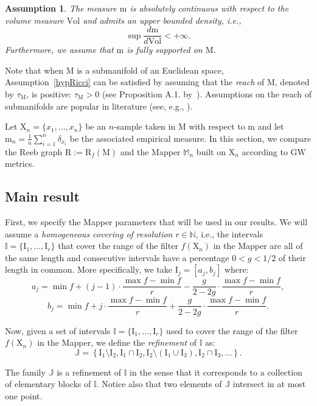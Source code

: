 \documentclass[pdflatex,sn-mathphys-ay]{sn-jnl}%
\newcommand{\reeb}{\mathrm{R}}
\newcommand{\man}{\mathrm{M}}
\newcommand{\sample}{\mathrm{X}}
\newcommand{\mes}{\mathrm{m}}
\newcommand{\gromov}{\mathrm{GW}}
\newcommand{\Reeb}{{\mathrm R}}
\newcommand{\interv}{{\mathrm {I}}}
\newcommand{\mapper}{{\mathbb{M}_n}}
\newcommand{\dirac}{\delta}
\newcommand{\diracn}{\mathrm{m}_n}
\newcommand{\vol}{\mathrm{Vol}}
\newcommand{\N}{\mathbb{N}}
\newtheorem{hypothesis}{Assumption}
\theoremstyle{thmstyleone}%
\begin{document}
\begin{hypothesis}\label{hypdensity}
	The measure $\mes$ is absolutely continuous with respect to the volume measure $\vol$ and admits an upper bounded density, i.e., $$\sup\frac{d\mes}{d\vol}<+\infty.$$ Furthermore, we assume that $\mes$ is fully supported on $\man$.  
\end{hypothesis}

Note that when $\man$ is a submanifold of an Euclidean space, Assumption~\ref{hypRicci} can be satisfied by assuming that the {\em reach} of $\man$, denoted by $\tau_{\man}$, is positive: $\tau_{\man}>0$ (see Proposition A.1. by~\citet{aamari2019estimating}). Assumptions on the reach of submanifolds are popular in literature (see, e.g., \citet{niyogi2008finding,burgisser2018computing}). 

Let $\sample_n=\{x_1,...,x_n\}$ be an $n$-sample taken in $\man$ with respect to $\mes$ and let $\diracn=\frac{1}{n}\sum_{i=1}^n \dirac_{x_i}$ be the associated empirical measure. In this section, we compare the Reeb graph $\Reeb:=\reeb_f(\man)$ and the Mapper $\mapper$ built on $\sample_n$ according to $\gromov$ metrics.


\subsection{Main result}

First, we specify the Mapper parameters that will be used in our results.
We will assume a {\em homogeneous covering of resolution} $r\in\N$, i.e., the intervals $\mathbb{I}=\{\interv_1,...,\interv_r\}$ that cover the range of the filter $f(\sample_n)$ in the Mapper are all of the same length and consecutive intervals have a percentage $0<g<1/2$ of their length in common. More specifically, we take $\interv_j=[a_j,b_j]$ where:
$$a_j=\min f+(j-1)\cdot\frac{\max f-\min f}{r}-\frac{g}{2-2 g}\cdot\frac{\max f - \min f}{r},$$
$$b_j=\min f+j\cdot\frac{\max f-\min f}{r}+\frac{g}{2-2 g}\cdot\frac{\max f - \min f}{r}.$$

Now, given a set of intervals $\mathbb{I}=\{\interv_1,...,\interv_r\}$ used to cover the range of the filter $f(\sample_n)$ in the Mapper, we define the {\em refinement} of $\mathbb{I}$ as:
$$\mathbb{J}=\left\{\interv_1\setminus\interv_2,\interv_1\cap\interv_2,\interv_2\setminus(\interv_1\cup\interv_3),\interv_2\cap\interv_3,\dots\right\}.$$

The family $\mathbb{J}$ is a refinement of $\mathbb{I}$ in the sense that it corresponds to a collection of elementary blocks of $\mathbb{I}$. Notice also that two elements of $\mathbb{J}$ intersect in at most one point. 
\end{document}
